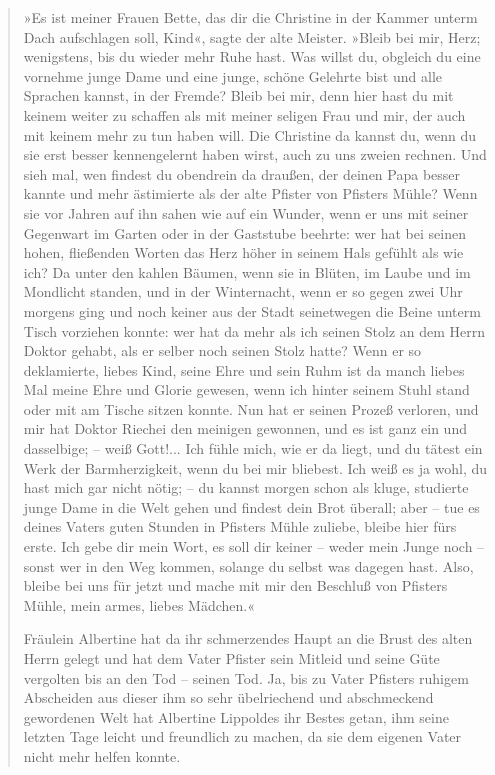 \begin{verse}
»Es ist meiner Frauen Bette, das dir die Christine in der Kammer
unterm Dach aufschlagen soll, Kind«, sagte der alte Meister. »Bleib
bei mir, Herz; wenigstens, bis du wieder mehr Ruhe hast. Was willst
du, obgleich du eine vornehme junge Dame und eine junge, schöne
Gelehrte bist und alle Sprachen kannst, in der Fremde? Bleib bei
mir, denn hier hast du mit keinem weiter zu schaffen als mit meiner
seligen Frau und mir, der auch mit keinem mehr zu tun haben will.
Die Christine da kannst du, wenn du sie erst besser kennengelernt
haben wirst, auch zu uns zweien rechnen. Und sieh mal, wen findest
du obendrein da draußen, der deinen Papa besser kannte und mehr
ästimierte als der alte Pfister von Pfisters Mühle? Wenn sie vor
Jahren auf ihn sahen wie auf ein Wunder, wenn er uns mit seiner
Gegenwart im Garten oder in der Gaststube beehrte: wer hat bei
seinen hohen, fließenden Worten das Herz höher in seinem Hals
gefühlt als wie ich? Da unter den kahlen Bäumen, wenn sie in
Blüten, im Laube und im Mondlicht standen, und in der Winternacht,
wenn er so gegen zwei Uhr morgens ging und noch keiner aus der
Stadt seinetwegen die Beine unterm Tisch vorziehen konnte: wer hat
da mehr als ich seinen Stolz an dem Herrn Doktor gehabt, als er
selber noch seinen Stolz hatte? Wenn er so deklamierte, liebes
Kind, seine Ehre und sein Ruhm ist da manch liebes Mal meine Ehre
und Glorie gewesen, wenn ich hinter seinem Stuhl stand oder mit am
Tische sitzen konnte. Nun hat er seinen Prozeß verloren, und mir
hat Doktor Riechei den meinigen gewonnen, und es ist ganz ein und
dasselbige; – weiß Gott!... Ich fühle mich, wie er da liegt, und du
tätest ein Werk der Barmherzigkeit, wenn du bei mir bliebest. Ich
weiß es ja wohl, du hast mich gar nicht nötig; – du kannst morgen
schon als kluge, studierte junge Dame in die Welt gehen und findest
dein Brot überall; aber – tue es deines Vaters guten Stunden in
Pfisters Mühle zuliebe, bleibe hier fürs erste. Ich gebe dir mein
Wort, es soll dir keiner – weder mein Junge noch – sonst wer in den
Weg kommen, solange du selbst was dagegen hast. Also, bleibe bei
uns für jetzt und mache mit mir den Beschluß von Pfisters Mühle,
mein armes, liebes Mädchen.«

Fräulein Albertine hat da ihr schmerzendes Haupt an die Brust des
alten Herrn gelegt und hat dem Vater Pfister sein Mitleid und seine
Güte vergolten bis an den Tod – seinen Tod. Ja, bis zu Vater
Pfisters ruhigem Abscheiden aus dieser ihm so sehr übelriechend und
abschmeckend gewordenen Welt hat Albertine Lippoldes ihr Bestes
getan, ihm seine letzten Tage leicht und freundlich zu machen, da
sie dem eigenen Vater nicht mehr helfen konnte.


\end{verse}

